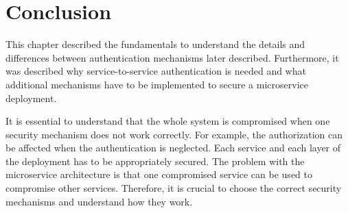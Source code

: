\section{Conclusion}
This chapter described the fundamentals to understand the details and differences between authentication mechanisms later described.
Furthermore, it was described why service-to-service authentication is needed and what additional mechanisms have to be implemented to secure a microservice deployment.

It is essential to understand that the whole system is compromised when one security mechanism does not work correctly.
For example, the authorization can be affected when the authentication is neglected.
Each service and each layer of the deployment has to be appropriately secured.
The problem with the microservice architecture is that one compromised service can be used to compromise other services.
Therefore, it is crucial to choose the correct security mechanisms and understand how they work. 
